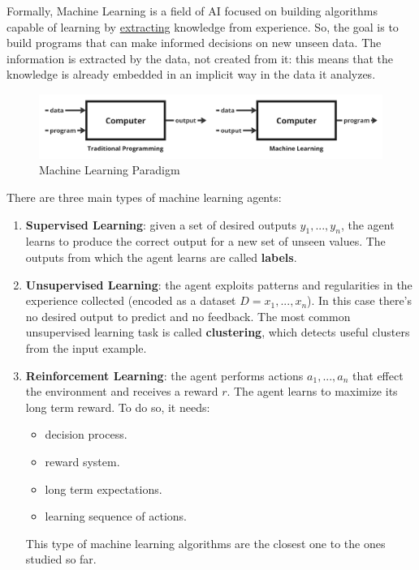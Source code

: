 \documentclass{article}
\begin{document}
Formally, Machine Learning is a field of AI focused on building algorithms capable of learning by \underline{extracting} knowledge from experience. So, the goal is to build programs that can make informed decisions on new unseen data. The information is extracted by the data, not created from it: this means that the knowledge is already embedded in an implicit way in the data it analyzes.

\begin{figure}[h]
    \centering
    \includegraphics[width=0.5\linewidth]{images/Machine Learning Paradigm.jpg}
    \caption{Machine Learning Paradigm}
    \label{fig:machine_learning_paradigm}
\end{figure}

\noindent There are three main types of machine learning agents:
\begin{enumerate}
    \item \textbf{Supervised Learning}: given a set of desired outputs $y_1, ..., y_n$, the agent learns to produce the correct output for a new set of unseen values. The outputs from which the agent learns are called \textbf{labels}.
    \item \textbf{Unsupervised Learning}: the agent exploits patterns and regularities in the experience collected (encoded as a dataset $D = x_1, ..., x_n$). In this case there's no desired output to predict and no feedback. The most common unsupervised learning task is called \textbf{clustering}, which detects useful clusters from the input example.
    \item \textbf{Reinforcement Learning}: the agent performs actions $a_1, ..., a_n$ that effect the environment and receives a reward $r$. The agent learns to maximize its long term reward. To do so, it needs:
    \begin{itemize}
        \item decision process.
        \item reward system.
        \item long term expectations.
        \item learning sequence of actions.
    \end{itemize}
    This type of machine learning algorithms are the closest one to the ones studied so far.
\end{enumerate}
\end{document}

